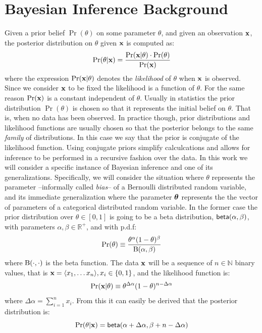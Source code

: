 \documentclass[sigconf, anonymous]{acmart}
\begin{document}
% 

\section{Bayesian Inference Background}
\label{sec_background}
Given a prior belief $\Pr(\theta)$ on some parameter $\theta$,
and given an observation $\textbf{x}$,
the posterior distribution on $\theta$ given $\textbf{x}$ is computed as:
\[
  \Pr(\theta | \textbf{x}) = \frac{\Pr(\textbf{x} | \theta) \cdot \Pr(\theta)}{\Pr(\textbf{x})}
\]
where the expression  $\Pr(\textbf{x} | \theta)$ denotes the \emph{likelihood} of $\theta$ when
$\textbf{x}$ is observed. Since we consider $\textbf{x}$ to be fixed the likelihood is a function of $\theta$.
For the same reason $\Pr(\textbf{x})$ is a constant independent of $\theta$.
Usually in statistics the prior distribution $\Pr(\theta)$ is chosen so that it represents
the initial belief on $\theta$. That is, when no data has been observed. In practice though,
prior distributions and likelihood functions are usually chosen so that the posterior
belongs to the same \emph{family} of distributions. In this case we say that the prior
is conjugate of the likelihood function. Using conjugate priors simplify calculcations and allows
for inference to be performed in a recursive fashion over the data.
In this work we will consider a specific instance of Bayesian inference and one of its generalizations.
Specifically, we will consider the situation where $\theta$ represents the parameter --informally called \emph{bias}--
of a Bernoulli distributed random variable, and its immediate generalization where the parameter $\boldsymbol{\theta}$ represents
the the vector of parameters of a categorical distributed random variable.
In the former case the prior distribution over $\theta\in [0,1]$ is going to be a beta distribution, $\mathsf{beta}(\alpha, \beta)$, with parameters
$\alpha,\beta\in\mathbb{R}^{+}$, and with p.d.f:
\[
  \Pr(\theta)\equiv \frac{\theta^{\alpha} (1- \theta)^{\beta}}{\textup{B}(\alpha,\beta)}
\]
where $\textup{B}(\cdot,\cdot)$ is the beta function.
The data $\textbf{x}$ will be a sequence of $n\in\mathbb{N}$ binary values, that is $\textbf{x}=\langle x_1,\dots x_n \rangle, x_i\in\{0,1\}$, and the likelihood function is:
\[
  \Pr(\textbf{x} | \theta)\equiv \theta^{\Delta \alpha}(1-\theta)^{n - \Delta \alpha}
\]
where $\Delta \alpha = \displaystyle\sum_{i=1}^{n}x_i$.
From this it can easily be derived that the posterior distribution is:
\[
  \Pr(\theta|\textbf{x})=\mathsf{beta}(\alpha + \Delta \alpha,\beta + n - \Delta \alpha)
\]
\end{document}

